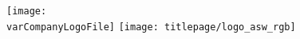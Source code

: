 \begin{titlepage}
	\vspace{0.5cm}


	\begin{figure}[!h]
		\center
		\ifdefined\varCompanyLogoFile
				\texttt{[image: \\varCompanyLogoFile]}
			\endminipage
				\hfill
			\endminipage
		\fi
			\texttt{[image: titlepage/logo\_asw\_rgb]}
		\endminipage
	\end{figure}
	
	
	\vfill\vfill

	\large\varEingereichtAm
	
	\vfill
	

	
\end{titlepage}
\makeatother
